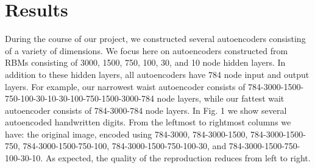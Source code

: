 \documentclass{article}
\begin{document}
\section{Results}\label{sec:results}

During the course of our project, we constructed several autoencoders consisting of a variety of dimensions. We focus here on autoencoders constructed from RBMs consisting of 3000, 1500, 750, 100, 30, and 10 node hidden layers. In addition to these hidden layers, all autoencoders have 784 node input and output layers. For example, our narrowest waist autoencoder consists of 784-3000-1500-750-100-30-10-30-100-750-1500-3000-784 node layers, while our fattest wait autoencoder consists of 784-3000-784 node layers. In Fig. 1 we show several autoencoded handwritten digits. From the leftmost to rightmost columns we have: the original image, encoded using 784-3000, 784-3000-1500, 784-3000-1500-750, 784-3000-1500-750-100, 784-3000-1500-750-100-30, and 784-3000-1500-750-100-30-10. As expected, the quality of the reproduction reduces from left to right.
\end{document}
